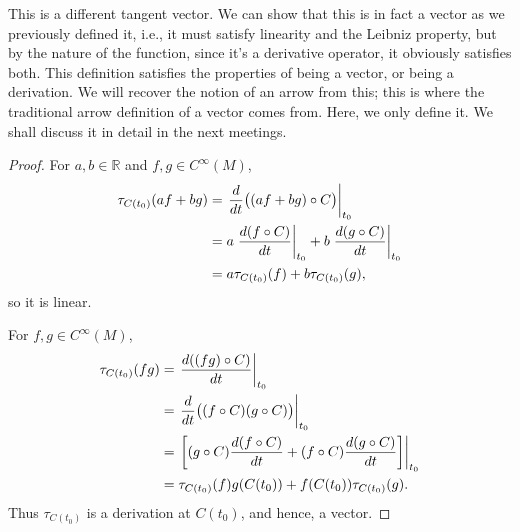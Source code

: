 		This is a different tangent vector. We can show that this is in fact a vector as we previously defined it, i.e.,
		it must satisfy linearity and the Leibniz property, but by the nature of the function, since it's a derivative operator, it obviously
		satisfies both. This definition satisfies the properties of being a vector, or being a derivation. We will recover the notion
		of an arrow from this; this is where the traditional arrow definition of a vector comes from.
		Here, we only define it. We shall discuss it in detail in the next meetings.
		\begin{proof}
			For $a,b\in\mathbb{R}$ and $f,g\in C^\infty(M)$,
			\begin{align}
				\tau_{C(t_0)}(af+bg)
				&=
				\eval{\dv{}{t}\bigl((af+bg)\circ C\bigr)}_{t_0} \notag\\
				&=
				a\eval{\dv{(f\circ C)}{t}}_{t_0}
				+b\eval{\dv{(g\circ C)}{t}}_{t_0} \notag\\
				&=
				a\tau_{C(t_0)}(f)+b\tau_{C(t_0)}(g),
			\end{align}
			so it is linear.

			For $f,g\in C^\infty(M)$,
			\begin{align}
				\tau_{C(t_0)}(fg)
				&=
				\eval{\dv{((fg)\circ C)}{t}}_{t_0} \notag\\
				&=
				\eval{\dv{}{t}\bigl((f\circ C)(g\circ C)\bigr)}_{t_0} \notag\\
				&=
				\eval{\qty[
					(g\circ C)
					\dv{(f\circ C)}{t}
					+
					(f\circ C)\dv{(g\circ C)}{t}
				]}_{t_0} \notag\\
				&=
				\tau_{C(t_0)}(f)g(C(t_0))
				+
				f(C(t_0))\tau_{C(t_0)}(g).
			\end{align}
			Thus $\tau_{C(t_0)}$ is a derivation at $C(t_0)$, and hence, a vector.
		\end{proof}

